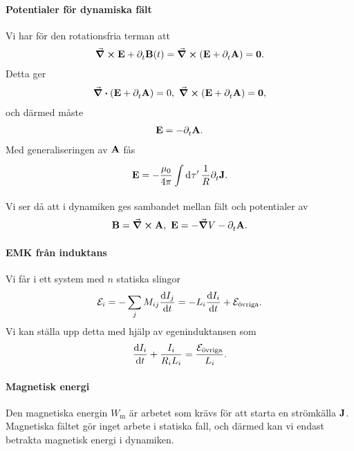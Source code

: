 \paragraph{Potentialer för dynamiska fält}
Vi har för den rotationsfria terman att
\begin{align*}
	\curl{\vb{E}} + \partial_{t}^{}\vb{B}(t) = \curl(\vb{E} + \partial_{t}^{}\vb{A}) = \vb{0}.
\end{align*}
Detta ger
\begin{align*}
	\div(\vb{E} + \partial_{t}^{}\vb{A}) = 0,\ \curl(\vb{E} + \partial_{t}^{}\vb{A}) = \vb{0},
\end{align*}
och därmed måste
\begin{align*}
	\vb{E} = -\partial_{t}^{}\vb{A}.
\end{align*}
Med generaliseringen av $\vb{A}$ fås
\begin{align*}
	\vb{E} = -\frac{\mu_{0}}{4\pi}\int\limits_{}^{}\dd[]{\tau'}\frac{1}{R}\partial_{t}^{}\vb{J}.
\end{align*}
Vi ser då att i dynamiken ges sambandet mellan fält och potentialer av
\begin{align*}
	\vb{B} = \curl{\vb{A}},\ \vb{E} = -\grad{V} - \partial_{t}^{}\vb{A}.
\end{align*}

\paragraph{EMK från induktans}
Vi får i ett system med $n$ statiska slingor
\begin{align*}
	\mathcal{E}_{i} = -\sum\limits_{j}M_{ij}\dv{I_{j}}{t} = -L_{i}\dv{I_{i}}{t} + \mathcal{E}_{\text{övriga}}.
\end{align*}
Vi kan ställa upp detta med hjälp av egeninduktansen som
\begin{align*}
	\dv{I_{i}}{t} + \frac{I_{i}}{R_{i}L_{i}} = \frac{\mathcal{E}_{\text{övriga}}}{L_{i}}.
\end{align*}

\paragraph{Magnetisk energi}
Den magnetiska energin $W_{\text{m}}$ är arbetet som krävs för att starta en strömkälla $\vb{J}$. Magnetiska fältet gör inget arbete i statiska fall, och därmed kan vi endast betrakta magnetisk energi i dynamiken.

